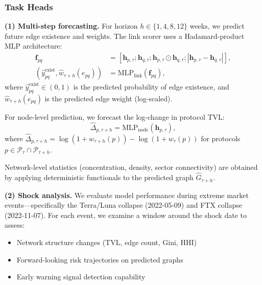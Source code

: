 \subsubsection{Task Heads}
\textbf{(1) Multi-step forecasting.}
For horizon $h\in\{1,4,8,12\}$ weeks, we predict future edge existence and weights. The link scorer uses a Hadamard-product MLP architecture:
\begin{align}
\mathbf{f}_{pq} &= [\mathbf{h}_{p,\tau}; \mathbf{h}_{q,\tau}; \mathbf{h}_{p,\tau}\odot\mathbf{h}_{q,\tau}; |\mathbf{h}_{p,\tau}-\mathbf{h}_{q,\tau}|],\\
(\widehat{y}^{\mathrm{exist}}_{pq}, \widehat{w}_{\tau+h}(e_{pq})) &= \mathrm{MLP}_{\mathrm{link}}(\mathbf{f}_{pq}),
\end{align}
where $\widehat{y}^{\mathrm{exist}}_{pq}\in(0,1)$ is the predicted probability of edge existence, and $\widehat{w}_{\tau+h}(e_{pq})$ is the predicted edge weight (log-scaled).

For node-level prediction, we forecast the log-change in protocol TVL:
\begin{equation}
\widehat{\Delta}_{p,\tau+h} = \mathrm{MLP}_{\mathrm{node}}(\mathbf{h}_{p,\tau}),
\end{equation}
where $\widehat{\Delta}_{p,\tau+h} = \log(1+w_{\tau+h}(p)) - \log(1+w_{\tau}(p))$ for protocols $p\in\mathcal{P}_{\tau}\cap\mathcal{P}_{\tau+h}$.

Network-level statistics (concentration, density, sector connectivity) are obtained by applying deterministic functionals to the predicted graph $\widehat{G}_{\tau+h}$.

\textbf{(2) Shock analysis.}
We evaluate model performance during extreme market events---specifically the Terra/Luna collapse (2022-05-09) and FTX collapse (2022-11-07). For each event, we examine a window around the shock date to assess:
\begin{itemize}
  \item Network structure changes (TVL, edge count, Gini, HHI)
  \item Forward-looking risk trajectories on predicted graphs
  \item Early warning signal detection capability
\end{itemize}



